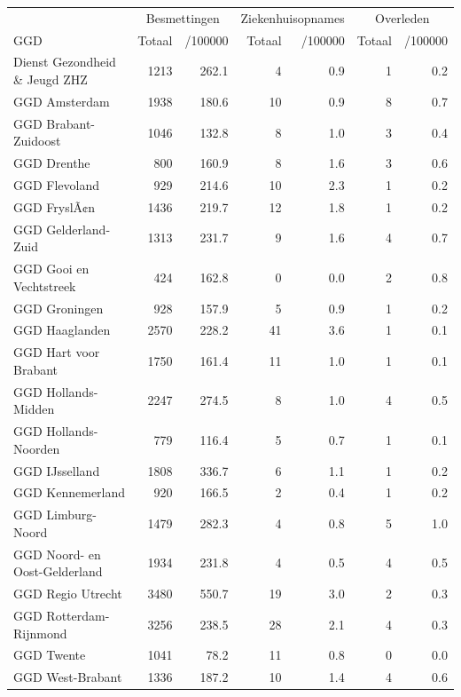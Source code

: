 \documentclass[
  english,
  man,floatsintext]{apa6}
\begin{document}
\begin{table}
\centering\begingroup\fontsize{10}{12}\selectfont

\begin{threeparttable}
\begin{tabular}{lrrrrrr}
\toprule
\multicolumn{1}{c}{ } & \multicolumn{2}{c}{Besmettingen} & \multicolumn{2}{c}{Ziekenhuisopnames} & \multicolumn{2}{c}{Overleden} \\
\cmidrule(l{3pt}r{3pt}){2-3} \cmidrule(l{3pt}r{3pt}){4-5} \cmidrule(l{3pt}r{3pt}){6-7}
GGD & Totaal & /100000 & Totaal & /100000 & Totaal & /100000\\
\midrule
Dienst Gezondheid \& Jeugd ZHZ & 1213 & 262.1 & 4 & 0.9 & 1 & 0.2\\
GGD Amsterdam & 1938 & 180.6 & 10 & 0.9 & 8 & 0.7\\
GGD Brabant-Zuidoost & 1046 & 132.8 & 8 & 1.0 & 3 & 0.4\\
GGD Drenthe & 800 & 160.9 & 8 & 1.6 & 3 & 0.6\\
GGD Flevoland & 929 & 214.6 & 10 & 2.3 & 1 & 0.2\\
GGD FryslÃ¢n & 1436 & 219.7 & 12 & 1.8 & 1 & 0.2\\
GGD Gelderland-Zuid & 1313 & 231.7 & 9 & 1.6 & 4 & 0.7\\
GGD Gooi en Vechtstreek & 424 & 162.8 & 0 & 0.0 & 2 & 0.8\\
GGD Groningen & 928 & 157.9 & 5 & 0.9 & 1 & 0.2\\
GGD Haaglanden & 2570 & 228.2 & 41 & 3.6 & 1 & 0.1\\
GGD Hart voor Brabant & 1750 & 161.4 & 11 & 1.0 & 1 & 0.1\\
GGD Hollands-Midden & 2247 & 274.5 & 8 & 1.0 & 4 & 0.5\\
GGD Hollands-Noorden & 779 & 116.4 & 5 & 0.7 & 1 & 0.1\\
GGD IJsselland & 1808 & 336.7 & 6 & 1.1 & 1 & 0.2\\
GGD Kennemerland & 920 & 166.5 & 2 & 0.4 & 1 & 0.2\\
GGD Limburg-Noord & 1479 & 282.3 & 4 & 0.8 & 5 & 1.0\\
GGD Noord- en Oost-Gelderland & 1934 & 231.8 & 4 & 0.5 & 4 & 0.5\\
GGD Regio Utrecht & 3480 & 550.7 & 19 & 3.0 & 2 & 0.3\\
GGD Rotterdam-Rijnmond & 3256 & 238.5 & 28 & 2.1 & 4 & 0.3\\
GGD Twente & 1041 & 78.2 & 11 & 0.8 & 0 & 0.0\\
GGD West-Brabant & 1336 & 187.2 & 10 & 1.4 & 4 & 0.6\\

\end{tabular}
\end{threeparttable}
\end{table}
\end{document}
